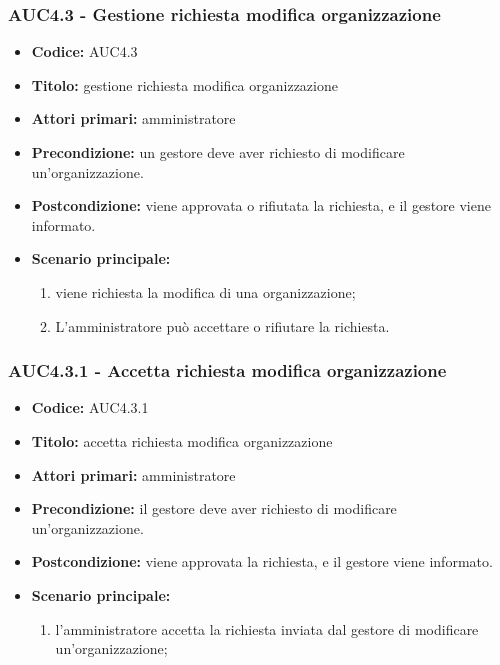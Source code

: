 \documentclass[casi-duso]{subfiles}
\begin{document}
\subsubsection{AUC4.3 - Gestione richiesta modifica organizzazione}%
\label{subsub:AUC4.3}
\begin{itemize}
  \item \textbf{Codice:} AUC4.3
  \item \textbf{Titolo:} gestione richiesta modifica organizzazione
  \item \textbf{Attori primari:} amministratore
  \item \textbf{Precondizione:} un gestore deve aver richiesto di modificare un'organizzazione.
  \item \textbf{Postcondizione:} viene approvata o rifiutata la richiesta, e il gestore viene informato.
  \item \textbf{Scenario principale:}
  \begin{enumerate}
    \item viene richiesta la modifica di una organizzazione;
    \item L'amministratore può accettare o rifiutare la richiesta.
  \end{enumerate}
\end{itemize}

\subsubsection{AUC4.3.1 - Accetta richiesta modifica organizzazione}%
\label{subsub:AUC4.3.1}
\begin{itemize}
  \item \textbf{Codice:} AUC4.3.1
  \item \textbf{Titolo:} accetta richiesta modifica organizzazione
  \item \textbf{Attori primari:} amministratore
  \item \textbf{Precondizione:} il gestore deve aver richiesto di modificare un'organizzazione.
  \item \textbf{Postcondizione:} viene approvata la richiesta, e il gestore viene informato.
  \item \textbf{Scenario principale:}
  \begin{enumerate}
    \item  l'amministratore accetta la richiesta inviata dal gestore di modificare un'organizzazione;
  \end{enumerate}
\end{itemize}
\end{document}
